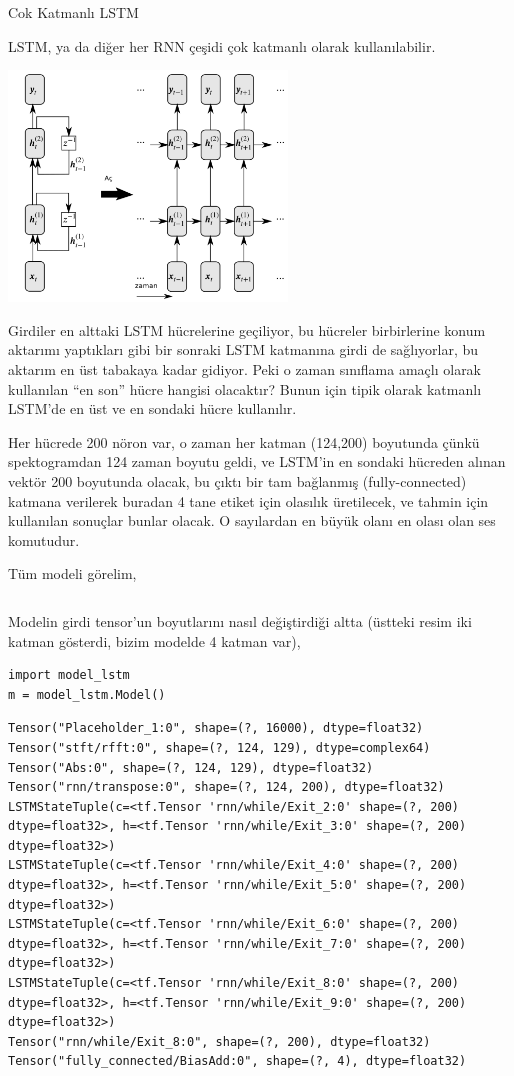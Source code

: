 \documentclass[12pt,fleqn]{article}\usepackage{../../common}
\begin{document}
Cok Katmanlı LSTM

LSTM, ya da diğer her RNN çeşidi çok katmanlı olarak kullanılabilir. 

\includegraphics[width=20em]{stacked-rnn.png}

Girdiler en alttaki LSTM hücrelerine geçiliyor, bu hücreler birbirlerine
konum aktarımı yaptıkları gibi bir sonraki LSTM katmanına girdi de 
sağlıyorlar, bu aktarım en üst tabakaya kadar gidiyor. Peki o zaman
sınıflama amaçlı olarak kullanılan ``en son'' hücre hangisi olacaktır?
Bunun için tipik olarak katmanlı LSTM'de en üst ve en sondaki hücre
kullanılır. 

Her hücrede 200 nöron var, o zaman her katman (124,200) boyutunda çünkü
spektogramdan 124 zaman boyutu geldi, ve LSTM'in en sondaki hücreden alınan
vektör 200 boyutunda olacak, bu çıktı bir tam bağlanmış (fully-connected)
katmana verilerek buradan 4 tane etiket için olasılık üretilecek, ve tahmin
için kullanılan sonuçlar bunlar olacak. O sayılardan en büyük olanı en
olası olan ses komutudur.

Tüm modeli görelim,

\inputminted[fontsize=\footnotesize]{python}{model_lstm.py}

Modelin girdi tensor'un boyutlarını nasıl değiştirdiği altta (üstteki resim
iki katman gösterdi, bizim modelde 4 katman var),

\begin{verbatim}
import model_lstm
m = model_lstm.Model()
\end{verbatim}

\begin{verbatim}
Tensor("Placeholder_1:0", shape=(?, 16000), dtype=float32)
Tensor("stft/rfft:0", shape=(?, 124, 129), dtype=complex64)
Tensor("Abs:0", shape=(?, 124, 129), dtype=float32)
Tensor("rnn/transpose:0", shape=(?, 124, 200), dtype=float32)
LSTMStateTuple(c=<tf.Tensor 'rnn/while/Exit_2:0' shape=(?, 200) dtype=float32>, h=<tf.Tensor 'rnn/while/Exit_3:0' shape=(?, 200) dtype=float32>)
LSTMStateTuple(c=<tf.Tensor 'rnn/while/Exit_4:0' shape=(?, 200) dtype=float32>, h=<tf.Tensor 'rnn/while/Exit_5:0' shape=(?, 200) dtype=float32>)
LSTMStateTuple(c=<tf.Tensor 'rnn/while/Exit_6:0' shape=(?, 200) dtype=float32>, h=<tf.Tensor 'rnn/while/Exit_7:0' shape=(?, 200) dtype=float32>)
LSTMStateTuple(c=<tf.Tensor 'rnn/while/Exit_8:0' shape=(?, 200) dtype=float32>, h=<tf.Tensor 'rnn/while/Exit_9:0' shape=(?, 200) dtype=float32>)
Tensor("rnn/while/Exit_8:0", shape=(?, 200), dtype=float32)
Tensor("fully_connected/BiasAdd:0", shape=(?, 4), dtype=float32)
\end{verbatim}
\end{document}
